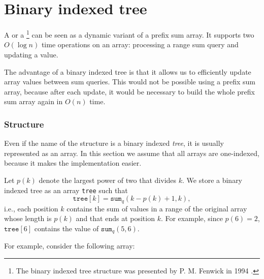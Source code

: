 \section{Binary indexed tree}


A  or a \footnote{The
binary indexed tree structure was presented by P. M. Fenwick in 1994 \cite{fen94}.}
can be seen as a dynamic variant of a prefix sum array.
It supports two $O(\log n)$ time operations on an array:
processing a range sum query and updating a value.

The advantage of a binary indexed tree is
that it allows us to efficiently update
array values between sum queries.
This would not be possible using a prefix sum array,
because after each update, it would be necessary to build the
whole prefix sum array again in $O(n)$ time.

\subsubsection{Structure}

Even if the name of the structure is a binary indexed \emph{tree},
it is usually represented as an array.
In this section we assume that all arrays are one-indexed,
because it makes the implementation easier.

Let $p(k)$ denote the largest power of two that
divides $k$.
We store a binary indexed tree as an array \texttt{tree}
such that
\[ \texttt{tree}[k] = \texttt{sum}_q(k-p(k)+1,k),\]
i.e., each position $k$ contains the sum of values
in a range of the original array whose length is $p(k)$
and that ends at position $k$.
For example, since $p(6)=2$, $\texttt{tree}[6]$
contains the value of $\texttt{sum}_q(5,6)$.

For example, consider the following array:
\begin{center}
\end{center}

